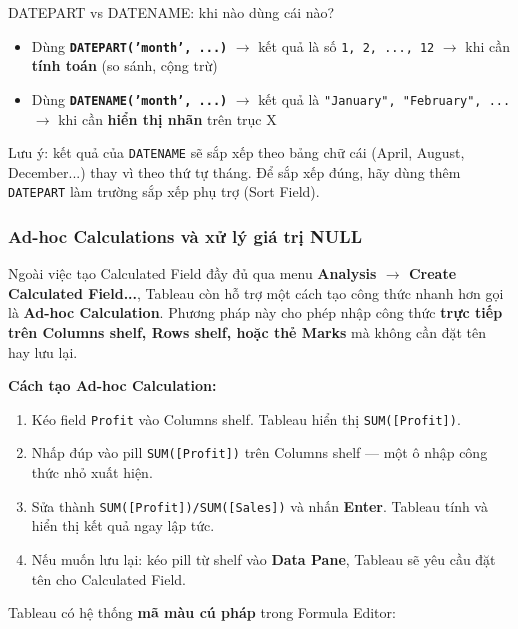 \documentclass[12pt]{article}
\begin{document}
\begin{guidelinebox}{DATEPART vs DATENAME: khi nào dùng cái nào?}
\begin{itemize}[nosep]
    \item Dùng \textbf{\texttt{DATEPART('month', ...)}} $\rightarrow$ kết quả là số \texttt{1, 2, ..., 12} $\rightarrow$ khi cần \textbf{tính toán} (so sánh, cộng trừ)
    \item Dùng \textbf{\texttt{DATENAME('month', ...)}} $\rightarrow$ kết quả là \texttt{"January", "February", ...} $\rightarrow$ khi cần \textbf{hiển thị nhãn} trên trục X
\end{itemize}
\noindent Lưu ý: kết quả của \texttt{DATENAME} sẽ sắp xếp theo bảng chữ cái (April, August, December...) thay vì theo thứ tự tháng. Để sắp xếp đúng, hãy dùng thêm \texttt{DATEPART} làm trường sắp xếp phụ trợ (Sort Field).
\end{guidelinebox}

\subsubsection{Ad-hoc Calculations và xử lý giá trị NULL}

\noindent Ngoài việc tạo Calculated Field đầy đủ qua menu \textbf{Analysis $\rightarrow$ Create Calculated Field...}, Tableau còn hỗ trợ một cách tạo công thức nhanh hơn gọi là \textbf{Ad-hoc Calculation}. Phương pháp này cho phép nhập công thức \textbf{trực tiếp trên Columns shelf, Rows shelf, hoặc thẻ Marks} mà không cần đặt tên hay lưu lại.

\noindent \textbf{Cách tạo Ad-hoc Calculation:}
\begin{enumerate}[nosep]
    \item Kéo field \texttt{Profit} vào Columns shelf. Tableau hiển thị \texttt{SUM([Profit])}.
    \item Nhấp đúp vào pill \texttt{SUM([Profit])} trên Columns shelf --- một ô nhập công thức nhỏ xuất hiện.
    \item Sửa thành \texttt{SUM([Profit])/SUM([Sales])} và nhấn \textbf{Enter}. Tableau tính và hiển thị kết quả ngay lập tức.
    \item Nếu muốn lưu lại: kéo pill từ shelf vào \textbf{Data Pane}, Tableau sẽ yêu cầu đặt tên cho Calculated Field.
\end{enumerate}

\noindent Tableau có hệ thống \textbf{mã màu cú pháp} trong Formula Editor:
\end{document}
